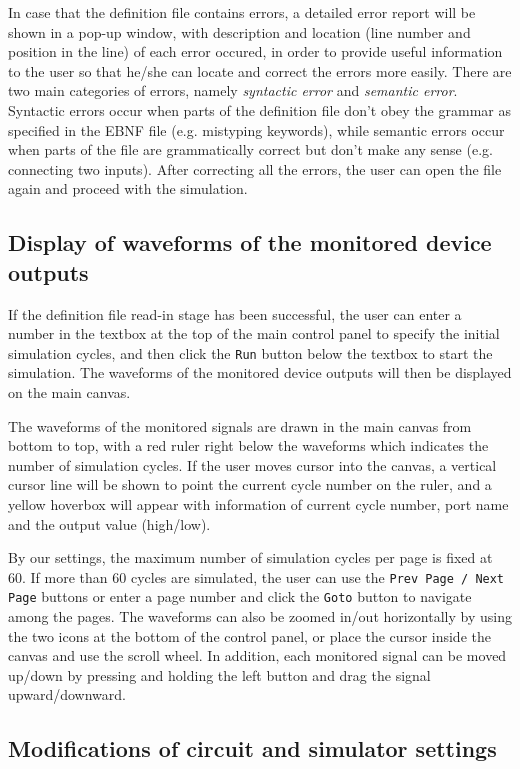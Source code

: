 \documentclass[10pt,a4paper]{article}
\begin{document}
In case that the definition file contains errors, a detailed error
report will be shown in a pop-up window, with description and location
(line number and position in the line) of each error occured, in order
to provide useful information to the user so that he/she can locate
and correct the errors more easily. There are two main categories of
errors, namely \emph{syntactic error} and \emph{semantic error}. Syntactic
errors occur when parts of the definition file don't obey the grammar
as specified in the EBNF file (e.g. mistyping keywords), while
semantic errors occur when parts of the file are grammatically correct
but don't make any sense (e.g. connecting two inputs). After
correcting all the errors, the user can open the file again and
proceed with the simulation.

\subsection{Display of waveforms of the monitored device outputs}
\label{sec:orgf17cd14}

If the definition file read-in stage has been successful, the user can
enter a number in the textbox at the top of the main control panel to
specify the initial simulation cycles, and then click the \texttt{Run} button
below the textbox to start the simulation. The waveforms of the
monitored device outputs will then be displayed on the main canvas.

The waveforms of the monitored signals are drawn in the main canvas
from bottom to top, with a red ruler right below the waveforms which
indicates the number of simulation cycles. If the user moves cursor
into the canvas, a vertical cursor line will be shown to point the
current cycle number on the ruler, and a yellow hoverbox will appear
with information of current cycle number, port name and the output
value (high/low).

By our settings, the maximum number of simulation cycles per page is
fixed at 60. If more than 60 cycles are simulated, the user can use
the \texttt{Prev Page / Next Page} buttons or enter a page number and click
the \texttt{Goto} button to navigate among the pages. The waveforms can also
be zoomed in/out horizontally by using the two icons at the bottom of
the control panel, or place the cursor inside the canvas and use the
scroll wheel. In addition, each monitored signal can be moved up/down
by pressing and holding the left button and drag the signal
upward/downward.


\subsection{Modifications of circuit and simulator settings}
\label{sec:org38fd84f}
\end{document}
